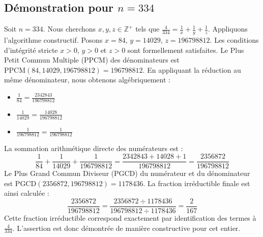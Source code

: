 \documentclass[11pt,a4paper]{article}
\begin{document}
\subsection{Démonstration pour $n = 334$}
Soit $n = 334$. Nous cherchons $x, y, z \in \mathbb{Z}^{+}$ tels que $\frac{4}{334} = \frac{1}{x} + \frac{1}{y} + \frac{1}{z}$.
Appliquons l'algorithme constructif. Posons $x = 84$, $y = 14029$, $z = 196798812$.
Les conditions d'intégrité stricte $x > 0$, $y > 0$ et $z > 0$ sont formellement satisfaites.
Le Plus Petit Commun Multiple (PPCM) des dénominateurs est $\text{PPCM}(84, 14029, 196798812) = 196798812$.
En appliquant la réduction au même dénominateur, nous obtenons algébriquement :
\begin{itemize}
    \item $\frac{1}{84} = \frac{2342843}{196798812}$
    \item $\frac{1}{14029} = \frac{14028}{196798812}$
    \item $\frac{1}{196798812} = \frac{1}{196798812}$
\end{itemize}
La sommation arithmétique directe des numérateurs est :
$$ \frac{1}{84} + \frac{1}{14029} + \frac{1}{196798812} = \frac{2342843 + 14028 + 1}{196798812} = \frac{2356872}{196798812} $$
Le Plus Grand Commun Diviseur (PGCD) du numérateur et du dénominateur est $\text{PGCD}(2356872, 196798812) = 1178436$.
La fraction irréductible finale est ainsi calculée :
$$ \frac{2356872}{196798812} = \frac{2356872 \div 1178436}{196798812 \div 1178436} = \frac{2}{167} $$
Cette fraction irréductible correspond exactement par identification des termes à $\frac{4}{334}$. L'assertion est donc démontrée de manière constructive pour cet entier.
\end{document}
